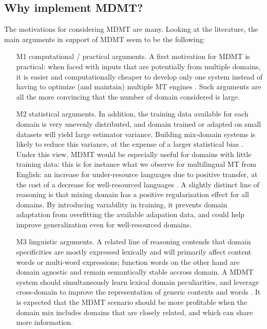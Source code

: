 \documentclass[11pt]{article}
\begin{document}
\subsection{Why implement MDMT? \label{ssec:whymdmt}}
The motivations for considering MDMT are many. Looking at the literature, the main arguments in support of MDMT seem to be the following:
\begin{enumerate}
\item[M1] computational / practical arguments. A first motivation for MDMT is practical: when faced with inputs that are potentially from multiple domains, it is easier and computationally cheaper to develop only one system instead of having to optimize (and maintain) multiple MT engines \cite{Sennrich13multidomain}. Such arguments are all the more convincing that the number of domain considered is large.
  
\item[M2] statistical arguments. In addition, the training data available for each domain is very unevenly distributed, and domain trained or adapted on small datasets will yield large estimator variance. Building mix-domain systems is likely to reduce this variance, at the expense of a larger statistical bias \cite{Clark12onesystem}. Under this view, MDMT would be especially useful for domains with little training data: this is for instance what we observe for multilingual MT from English: an increase for under-resource languages due to positive transfer, at the cost of a decrease for well-resourced languages \cite{Arivazhagan19massively}. A slightly distinct line of reasoning is that mixing domain has a positive regularization effect for all domains. By introducing variability in training, it prevents domain adaptation from overfitting the available adapation data, and could help improve generalization even for well-resourced domains.
  
\item[M3] linguistic arguments. A related line of reasoning contends that domain specificities are mostly expressed lexically and will primarily affect content words or multi-word expressions; function words on the other hand are domain agnostic and remain semantically stable accross domain. A MDMT system should simultaneously learn lexical domain peculiarities, and leverage cross-domain to improve the representation of generic contexts and words \cite{Zeng18multidomain,Pham19generic}. It is expected that the MDMT scenario should be more profitable when the domain mix includes domains that are closely related, and which can share more information.
\end{enumerate}
\end{document}
